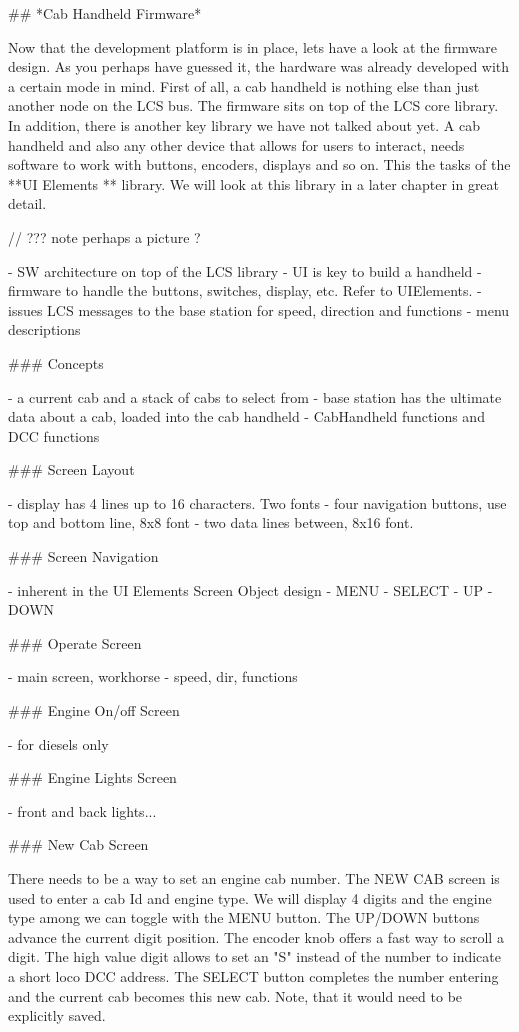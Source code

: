 ## *Cab Handheld Firmware*

Now that the development platform is in place, lets have a look at the firmware design. As you perhaps have guessed it, the hardware was already developed with a certain mode in mind. First of all, a cab handheld is nothing else than just another node on the LCS bus. The firmware sits on top of the LCS core library. In addition, there is another key library we have not talked about yet. A cab handheld and also any other device that allows for users to interact, needs software to work with buttons, encoders, displays and so on. This the tasks of the **UI Elements ** library. We will look at this library in a later chapter in great detail.

// ??? note perhaps a picture ?

- SW architecture on top of the LCS library
- UI is key to build a handheld
- firmware to handle the buttons, switches, display, etc. Refer to UIElements.
- issues LCS messages to the base station for speed, direction and functions
- menu descriptions

### Concepts

- a current cab and a stack of cabs to select from
- base station has the ultimate data about a cab, loaded into the cab handheld
- CabHandheld functions and DCC functions

### Screen Layout

- display has 4 lines up to 16 characters. Two fonts
- four navigation buttons, use top and bottom line, 8x8 font
- two data lines between, 8x16 font.

### Screen Navigation

- inherent in the UI Elements Screen Object design
- MENU
- SELECT
- UP
- DOWN

### Operate Screen

- main screen, workhorse
- speed, dir, functions

### Engine On/off Screen

- for diesels only

### Engine Lights Screen

- front and back lights...

### New Cab Screen

There needs to be a way to set an engine cab number. The NEW CAB screen is used to enter a cab Id and engine type. We will display 4 digits and the engine type among we can toggle with the MENU button. The UP/DOWN buttons advance the current digit position. The encoder knob offers a fast way to scroll a digit. The high value digit allows to set an "S" instead of the number to indicate a short loco DCC address. The SELECT button completes the number entering and the current cab becomes this new cab. Note, that it would need to be explicitly saved.

